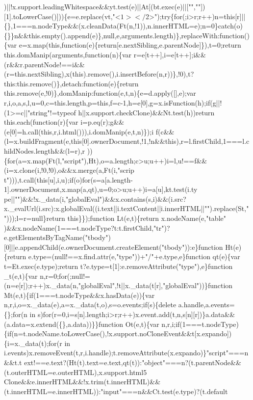 \begin{DoxyCode}
{      )||!x.support.leadingWhitespace&&yt.test(e)||At[(bt.exec(e)||["",""])[1].toLowerCase()]))\{e=e.replace(vt,"<$
      1></$2>");try\{for(;i>r;r++)n=this[r]||\{\},1===n.nodeType&&(x.cleanData(Ft(n,!1)),n.innerHTML=e);n=0\}catch(o)\{\}\}n&&this.empty().append(e)\},null,e,arguments.length)\},replaceWith:function()\{var
       e=x.map(this,function(e)\{return[e.nextSibling,e.parentNode]\}),t=0;return this.domManip(arguments,function(n)\{var
       r=e[t++],i=e[t++];i&&
      (r&&r.parentNode!==i&&(r=this.nextSibling),x(this).remove(),i.insertBefore(n,r))\},!0),t?this:this.remove()\},detach:function(e)\{return this.remove(e,!0)\},domManip:function(e,t,n)\{e=d.apply([],e);var
       r,i,o,a,s,l,u=0,c=this.length,p=this,f=c-1,h=e[0],g=x.isFunction(h);if(g||!(1>=c||"string"!=typeof
       h||x.support.checkClone)&&Nt.test(h))return this.each(function(r)\{var
       i=p.eq(r);g&&(e[0]=h.call(this,r,i.html())),i.domManip(e,t,n)\});i
      f(c&&(l=x.buildFragment(e,this[0].ownerDocument,!1,!n&&this),r=l.firstChild,1===l.childNodes.length&&(l=r),r
      ))\{for(a=x.map(Ft(l,"script"),Ht),o=a.length;c>u;u++)i=l,u!==f&&(i=x.clone(i,!0,!0),o&&x.merge(a,Ft(i,"scrip
      t"))),t.call(this[u],i,u);if(o)for(s=a[a.length-1].ownerDocument,x.map(a,qt),u=0;o>u;u++)i=a[u],kt.test(i.ty
      pe||"")&&!x.\_data(i,"globalEval")&&x.contains(s,i)&&(i.src?x.\_evalUrl(i.src):x.globalEval((i.text||i.textContent||i.innerHTML||"").replace(St,"")));l=r=null\}return this\}\});function Lt(e,t)\{return
       x.nodeName(e,"table"
      )&&x.nodeName(1===t.nodeType?t:t.firstChild,"tr")?e.getElementsByTagName("tbody")[0]||e.appendChild(e.ownerDocument.createElement("tbody")):e\}function Ht(e)\{return
       e.type=(null!==x.find.attr(e,"type"))+"/"+e.type,e\}function qt(e)\{var t=Et.exec(e.type);return t?e.type=t[1]:e.removeAttribute("type"),e\}function \_t(e,t)\{var
       n,r=0;for(;null!=(n=e[r]);r++)x.\_data(n,"globalEval",!t||x.\_data(t[r],"globalEval"))\}function
       Mt(e,t)\{if(1===t.nodeType&&x.hasData(e))\{var n,r,i,o=x.\_data(e),a=x.\_data(t,o),s=o.events;if(s)\{delete
       a.handle,a.events=\{\};for(n in
       s)for(r=0,i=s[n].length;i>r;r++)x.event.add(t,n,s[n][r])\}a.data&&(a.data=x.extend(\{\},a.data))\}\}function Ot(e,t)\{var
       n,r,i;if(1===t.nodeType)\{if(n=t.nodeName.toLowerCase(),!x.support.noCloneEvent&&t[x.expando])\{i=x.\_data(t);for(r in
       i.events)x.removeEvent(t,r,i.handle);t.removeAttribute(x.expando)\}"script"===n&&t.t
      ext!==e.text?(Ht(t).text=e.text,qt(t)):"object"===n?(t.parentNode&&(t.outerHTML=e.outerHTML),x.support.html5
      Clone&&e.innerHTML&&!x.trim(t.innerHTML)&&(t.innerHTML=e.innerHTML)):"input"===n&&Ct.test(e.type)?(t.default
}
\end{DoxyCode}
